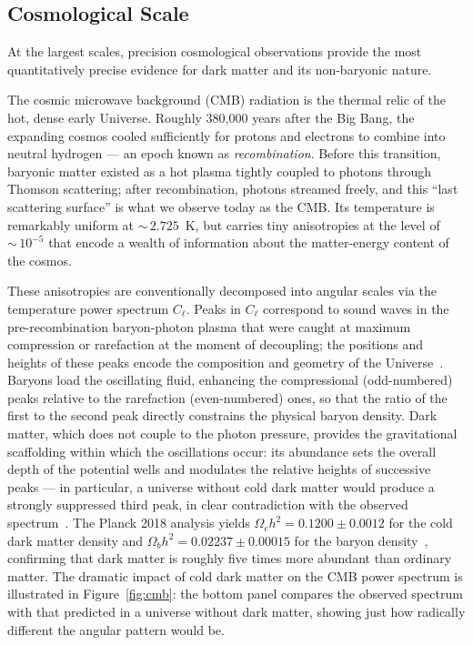 \subsection{Cosmological Scale}
\label{sec:1.1.3}

At the largest scales, precision cosmological observations provide the most quantitatively precise evidence for dark matter and its non-baryonic nature.

The cosmic microwave background (CMB) radiation is the thermal relic of the hot, dense early Universe.
Roughly 380,000 years after the Big Bang, the expanding cosmos cooled sufficiently for protons and electrons to combine into neutral hydrogen --- an epoch known as \emph{recombination}.
Before this transition, baryonic matter existed as a hot plasma tightly coupled to photons through Thomson scattering; after recombination, photons streamed freely, and this ``last scattering surface'' is what we observe today as the CMB.
Its temperature is remarkably uniform at ${\sim}\,2.725$~K, but carries tiny anisotropies at the level of ${\sim}\,10^{-5}$ that encode a wealth of information about the matter-energy content of the cosmos.

These anisotropies are conventionally decomposed into angular scales via the temperature power spectrum $C_\ell$.
Peaks in $C_\ell$ correspond to sound waves in the pre-recombination baryon-photon plasma that were caught at maximum compression or rarefaction at the moment of decoupling; the positions and heights of these peaks encode the composition and geometry of the Universe~\cite{Aghanim:2018eyx,Cirelli:2024ssz}.
Baryons load the oscillating fluid, enhancing the compressional (odd-numbered) peaks relative to the rarefaction (even-numbered) ones, so that the ratio of the first to the second peak directly constrains the physical baryon density.
Dark matter, which does not couple to the photon pressure, provides the gravitational scaffolding within which the oscillations occur: its abundance sets the overall depth of the potential wells and modulates the relative heights of successive peaks --- in particular, a universe without cold dark matter would produce a strongly suppressed third peak, in clear contradiction with the observed spectrum~\cite{Cirelli:2024ssz}.
The Planck 2018 analysis yields $\Omega_c h^2 = 0.1200 \pm 0.0012$ for the cold dark matter density and $\Omega_b h^2 = 0.02237 \pm 0.00015$ for the baryon density~\cite{Aghanim:2018eyx}, confirming that dark matter is roughly five times more abundant than ordinary matter.
The dramatic impact of cold dark matter on the CMB power spectrum is illustrated in Figure~\ref{fig:cmb}: the bottom panel compares the observed spectrum with that predicted in a universe without dark matter, showing just how radically different the angular pattern would be.

